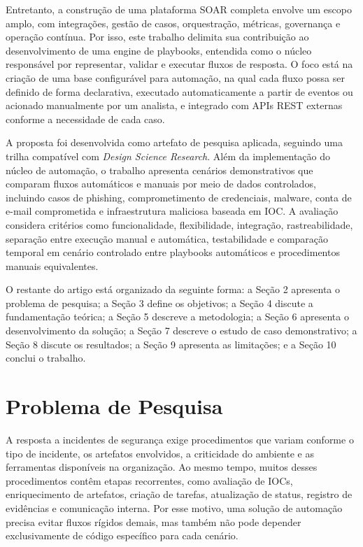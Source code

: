 \documentclass[article,a4paper,12pt,english,brazil,sumario=tradicional]{abntex2}
\begin{document}
Entretanto, a construção de uma plataforma SOAR completa envolve um escopo amplo, com integrações, gestão de casos, orquestração, métricas, governança e operação contínua. Por isso, este trabalho delimita sua contribuição ao desenvolvimento de uma engine de playbooks, entendida como o núcleo responsável por representar, validar e executar fluxos de resposta. O foco está na criação de uma base configurável para automação, na qual cada fluxo possa ser definido de forma declarativa, executado automaticamente a partir de eventos ou acionado manualmente por um analista, e integrado com APIs REST externas conforme a necessidade de cada caso.

A proposta foi desenvolvida como artefato de pesquisa aplicada, seguindo uma trilha compatível com \textit{Design Science Research}. Além da implementação do núcleo de automação, o trabalho apresenta cenários demonstrativos que comparam fluxos automáticos e manuais por meio de dados controlados, incluindo casos de phishing, comprometimento de credenciais, malware, conta de e-mail comprometida e infraestrutura maliciosa baseada em IOC. A avaliação considera critérios como funcionalidade, flexibilidade, integração, rastreabilidade, separação entre execução manual e automática, testabilidade e comparação temporal em cenário controlado entre playbooks automáticos e procedimentos manuais equivalentes.

O restante do artigo está organizado da seguinte forma: a Seção 2 apresenta o problema de pesquisa; a Seção 3 define os objetivos; a Seção 4 discute a fundamentação teórica; a Seção 5 descreve a metodologia; a Seção 6 apresenta o desenvolvimento da solução; a Seção 7 descreve o estudo de caso demonstrativo; a Seção 8 discute os resultados; a Seção 9 apresenta as limitações; e a Seção 10 conclui o trabalho.

\section{Problema de Pesquisa}

A resposta a incidentes de segurança exige procedimentos que variam conforme o tipo de incidente, os artefatos envolvidos, a criticidade do ambiente e as ferramentas disponíveis na organização. Ao mesmo tempo, muitos desses procedimentos contêm etapas recorrentes, como avaliação de IOCs, enriquecimento de artefatos, criação de tarefas, atualização de status, registro de evidências e comunicação interna. Por esse motivo, uma solução de automação precisa evitar fluxos rígidos demais, mas também não pode depender exclusivamente de código específico para cada cenário.
\end{document}
